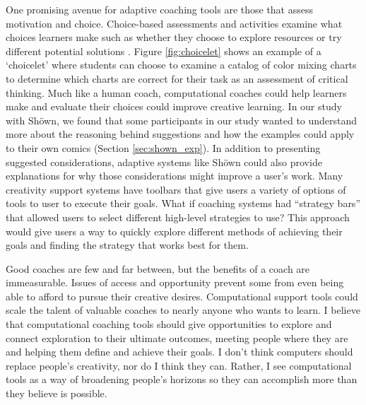 One promising avenue for adaptive coaching tools are those that assess motivation and choice. Choice-based assessments and activities examine what choices learners make such as whether they choose to explore resources or try different potential solutions \cite{schwartz2013measuring}. Figure \ref{fig:choicelet} shows an example of a `choicelet' where students can choose to examine a catalog of color mixing charts to determine which charts are correct for their task as an assessment of critical thinking. Much like a human coach, computational coaches could help learners make and evaluate their choices could improve creative learning. In our study with Sh{\"o}wn, we found that some participants in our study wanted to understand more about the reasoning behind suggestions and how the examples could apply to their own comics (Section \ref{sec:shown_exp}). In addition to presenting suggested considerations, adaptive systems like Sh{\"o}wn could also provide explanations for why those considerations might improve a user's work. Many creativity support systems have toolbars that give users a variety of options of tools to user to execute their goals. What if coaching systems had ``strategy bars'' that allowed users to select different high-level strategies to use? This approach would give users a way to quickly explore different methods of achieving their goals and finding the strategy that works best for them.

Good coaches are few and far between, but the benefits of a coach are immeasurable. Issues of access and opportunity prevent some from even being able to afford to pursue their creative desires. Computational support tools could scale the talent of valuable coaches to nearly anyone who wants to learn. I believe that computational coaching tools should give opportunities to explore and connect exploration to their ultimate outcomes, meeting people where they are and helping them define and achieve their goals. I don't think computers should replace people's creativity, nor do I think they can. Rather, I see computational tools as a way of broadening people's horizons so they can accomplish more than they believe is possible.

